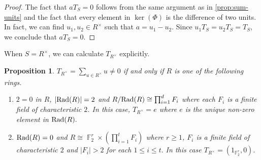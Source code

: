 \documentclass[11pt, a4paper]{amsart}
\newtheorem{prop}[thm]{Proposition}
\theoremstyle{definition}
\DeclareMathOperator{\F}{\mathbb{F}}
\numberwithin{equation}{section}
\newcommand{\Rad}{{\rm Rad}}
\begin{document}
    \begin{proof}
The fact that $aT_{S}=0$ follows from the same argument as in \cref{prop:sum-units} and the fact that every element in $\ker(\Phi)$ is the difference of two units.  In fact, we can find $u_1, u_2 \in R^{\times}$ such that $a=u_1-u_2.$ Since $u_1 T_{S}=u_2T_S=T_S$, we conclude that $aT_{S}=0.$
\end{proof}
When $S=R^{\times}$, we can calculate $T_{R^{\times}}$ explicitly. 
\begin{prop}
 $T_{R^{\times}}=\sum_{u \in R^{\times}}u \neq 0$ if and only if $R$ is one of the following rings. 
    \begin{enumerate}
        \item $2=0$ in $R$, $|\Rad(R)|=2$ and $R/\Rad(R) \cong \prod_{i=1}^d F_i$ where each $F_i$ is a finite field of characteristic $2$. In this case, $T_{R^{\times}}=e$ where $e$ is the unique non-zero element in $\Rad(R).$
        \item $\Rad(R)=0$ and $R \cong \F_2^r \times \left(\prod_{i=1}^t F_i \right)$ where $r \geq 1$, $F_i$ is a finite field of characteristic $2$ and $|F_i|>2$ for each $1 \leq i \leq t. $ In this case $T_{R^{\times}}=(1_{\F_2^r}, 0).$
    \end{enumerate}
\end{prop}
\end{document}

